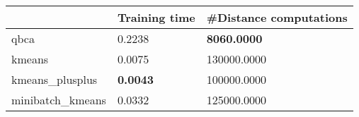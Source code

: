 \begin{table}[htbp]
\centering
\begin{tabular}{lll}
\toprule
 & Training time & #Distance computations \\
\midrule
qbca & 0.2238 & \textbf{8060.0000} \\
kmeans & 0.0075 & 130000.0000 \\
kmeans_plusplus & \textbf{0.0043} & 100000.0000 \\
minibatch_kmeans & 0.0332 & 125000.0000 \\
\bottomrule
\end{tabular}
\end{table}

